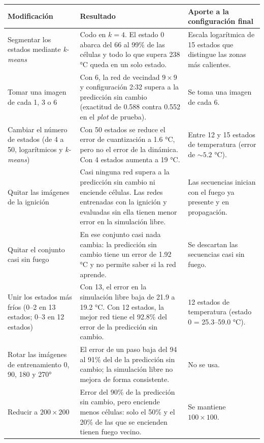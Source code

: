 	\begin{table}[htbp]
		\centering
		\footnotesize
		\setlength{\tabcolsep}{4pt}
		\setlength{\belowrulesep}{2pt}
		\begin{tabularx}{\textwidth}{p{}Xp{}}
			\toprule
			\textbf{Modificación} & \textbf{Resultado} & \textbf{Aporte a la configuración final} \\ \midrule
			Segmentar los estados mediante \textit{k-means} &
			Codo en $k = 4$. El estado 0 abarca del 66 al 99\% de las células y todo lo que supera 238 °C queda en un solo estado. &
			Escala logarítmica de 15 estados que distingue las zonas más calientes. \\ \midrule
			
			Tomar una imagen de cada 1, 3 o 6 &
			Con 6, la red de vecindad $9 \times 9$ y configuración 2:32 supera a la predicción sin cambio (exactitud de 0.588 contra 0.552 en el \textit{plot} de prueba). &
			Se toma una imagen de cada 6. \\ \midrule
			
			Cambiar el número de estados (de 4 a 50, logarítmicos y \textit{k-means}) &
			Con 50 estados se reduce el error de cuantización a 1.6 °C, pero no el error de la dinámica. Con 4 estados aumenta a 19 °C. &
			Entre 12 y 15 estados de temperatura (error de $\sim 5.2$ °C). \\ \midrule
			
			Quitar las imágenes de la ignición &
			Casi ninguna red supera a la predicción sin cambio ni enciende células. Las redes entrenadas con la ignición y evaluadas sin ella tienen menor error en la simulación libre. &
			Las secuencias inician con el fuego ya presente y en propagación. \\ \midrule
			
			Quitar el conjunto casi sin fuego &
			En ese conjunto casi nada cambia: la predicción sin cambio tiene un error de 1.92 °C y no permite saber si la red aprende. &
			Se descartan las secuencias casi sin fuego. \\ \midrule
			
			Unir los estados más fríos (0--2 en 13 estados; 0--3 en 12 estados) &
			Con 13, el error en la simulación libre baja de 21.9 a 19.2 °C. Con 12 estados, la mejor red tiene el 92.8\% del error de la predicción sin cambio. &
			12 estados de temperatura (estado 0 = 25.3--59.0 °C). \\ \midrule
			
			Rotar las imágenes de entrenamiento 0, 90, 180 y 270° &
			El error de un paso baja del 94 al 91\% del de la predicción sin cambio; la simulación libre no mejora de forma consistente. &
			No se usa. \\ \midrule
			Reducir a $200 \times 200$ &
			Error del 90\% de la predicción sin cambio, pero enciende menos células: solo el 50\% y el 20\% de las que se encienden tienen fuego vecino. &
			Se mantiene $100 \times 100$. \\ \midrule
			

\end{tabularx}
\end{table}

